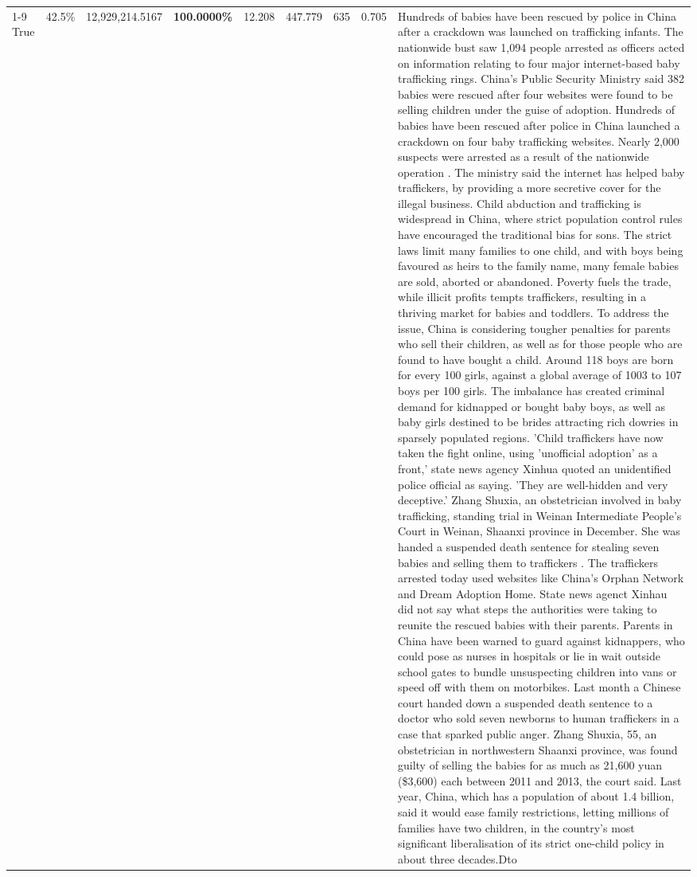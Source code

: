 \begin{table}[H]
\begin{tabular}{lllrlllll}
\cline{1-9}
True & 42.5\% & 12,929,214.5167 & \bfseries \color{red} 100.0000\% & 12.208 & 447.779 & 635 & 0.705 & Hundreds of babies have been rescued by police in China after a crackdown was launched on trafficking infants. The nationwide bust saw 1,094 people arrested as officers acted on information relating to four major internet-based baby trafficking rings. China's Public Security Ministry said 382 babies were rescued after four websites were found to be selling children under the guise of adoption. Hundreds of babies have been rescued after police in China launched a crackdown on four baby trafficking websites. Nearly 2,000 suspects were arrested as a result of the nationwide operation . The ministry said the internet has helped baby traffickers, by providing a more secretive cover for the illegal business. Child abduction and trafficking is widespread in China, where strict population control rules have encouraged the traditional bias for sons. The strict laws limit many families to one child, and with boys being favoured as heirs to the family name, many female babies are sold, aborted or abandoned. Poverty fuels the trade, while illicit profits tempts traffickers, resulting in a thriving market for babies and toddlers. To address the issue, China is considering tougher penalties for parents who sell their children, as well as for those people who are found to have bought a child. Around 118 boys are born for every 100 girls, against a global average of 1003 to 107 boys per 100 girls. The imbalance has created criminal demand for kidnapped or bought baby boys, as well as baby girls destined to be brides attracting rich dowries in sparsely populated regions. 'Child traffickers have now taken the fight online, using 'unofficial adoption' as a front,' state news agency Xinhua quoted an unidentified police official as saying. 'They are well-hidden and very deceptive.' Zhang Shuxia, an obstetrician involved in baby trafficking, standing trial in Weinan Intermediate People's Court in Weinan, Shaanxi province in December. She was handed a suspended death sentence for stealing seven babies and selling them to traffickers . The traffickers arrested today used websites like China's Orphan Network and Dream Adoption Home. State news agenct Xinhau did not say what steps the authorities were taking to reunite the rescued babies with their parents. Parents in China have been warned to guard against kidnappers, who could pose as nurses in hospitals or lie in wait outside school gates to bundle unsuspecting children into vans or speed off with them on motorbikes. Last month a Chinese court handed down a suspended death sentence to a doctor who sold seven newborns to human traffickers in a case that sparked public anger. Zhang Shuxia, 55, an obstetrician in northwestern Shaanxi province, was found guilty of selling the babies for as much as 21,600 yuan (\$3,600) each between 2011 and 2013, the court said. Last year, China, which has a population of about 1.4 billion, said it would ease family restrictions, letting millions of families have two children, in the country's most significant liberalisation of its strict one-child policy in about three decades.Dto \\

\end{tabular}
\end{table}
